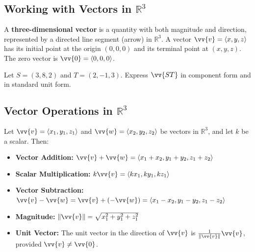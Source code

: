 \documentclass{article}
\begin{document}
\subsection*{Working with Vectors in \(\mathbb{R}^3\)}

\begin{definitionbox}
    A \textbf{three-dimensional vector} is a quantity with both magnitude and direction, represented by a directed line segment (arrow) in \(\mathbb{R}^3\). A vector \(\vv{v} = \langle x, y, z \rangle\) has its initial point at the origin \((0, 0, 0)\) and its terminal point at \((x, y, z)\). The zero vector is \(\vv{0} = \langle 0, 0, 0 \rangle\).
\end{definitionbox}

\begin{exercisebox}
    Let \(S = (3, 8, 2)\) and \(T = (2, -1, 3)\). Express \(\vv{ST}\) in component form and in standard unit form.
\end{exercisebox}

\subsection*{Vector Operations in \(\mathbb{R}^3\)}

\begin{definitionbox}
    Let \(\vv{v} = \langle x_1, y_1, z_1 \rangle\) and \(\vv{w} = \langle x_2, y_2, z_2 \rangle\) be vectors in \(\mathbb{R}^3\), and let \(k\) be a scalar. Then:
    \begin{itemize}
        \item \textbf{Vector Addition:} \(\vv{v} + \vv{w} = \langle x_1 + x_2, y_1 + y_2, z_1 + z_2 \rangle\)
        \item \textbf{Scalar Multiplication:} \(k\vv{v} = \langle kx_1, ky_1, kz_1 \rangle\)
        \item \textbf{Vector Subtraction:} \(\vv{v} - \vv{w} = \vv{v} + (-\vv{w}) = \langle x_1 - x_2, y_1 - y_2, z_1 - z_2 \rangle\)
        \item \textbf{Magnitude:} \(\|\vv{v}\| = \sqrt{x_1^2 + y_1^2 + z_1^2}\)
        \item \textbf{Unit Vector:} The unit vector in the direction of \(\vv{v}\) is \(\frac{1}{\|\vv{v}\|} \vv{v}\), provided \(\vv{v} \neq \vv{0}\).
    \end{itemize}
\end{definitionbox}
\end{document}
